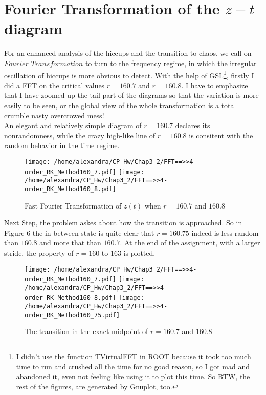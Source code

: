 \documentclass{article}
\begin{document}
\section{Fourier Transformation of the $z-t$ diagram}
\quad For an enhanced analysis of the hiccups and the transition to chaos, we call on $Fourier$ $Transfor$$mation$ to turn to the frequency regime, in which the irregular oscillation of hiccups is more obvious to detect. With the help of GSL\footnote{I didn't use the function TVirtualFFT in ROOT because it took too much time to run and crushed all the time for no good reason, so I got mad and abandoned it, even not feeling like using it to plot this time. So BTW, the rest of the figures, are generated by Gnuplot, too.}, firstly I did a FFT on the critical values $r=160.7$ and $r=160.8$. I have to emphasize that I have zoomed up the tail part of the diagrams so that the variation is more easily to be seen, or the global view of the whole transformation is a total crumble nasty overcrowed mess! \\
\quad An elegant and relatively simple diagram of $r=160.7$ declares its nonrandomness, while the crazy high-like line of $r=160.8$ is consitent with the random behavior in the time regime.\\
\begin{figure}[htbp]
\centering
\texttt{[image: /home/alexandra/CP\_Hw/Chap3\_2/FFT==>>4-order\_RK\_Method160\_7.pdf]}
\texttt{[image: /home/alexandra/CP\_Hw/Chap3\_2/FFT==>>4-order\_RK\_Method160\_8.pdf]}
\caption{Fast Fourier Transformation of $z(t)$ when $r=160.7$ and $160.8$}
\end{figure}
\newpage

Next Step, the problem askes about how the transition is approached. So in Figure 6 the in-between state is quite clear that $r=160.75$ indeed is less random than $160.8$ and more that than $160.7$. At the end of the assignment, with a larger stride, the property of $r=160$ to $163$ is plotted. \\ 
\begin{figure}[h]
\centering
\texttt{[image: /home/alexandra/CP\_Hw/Chap3\_2/FFT==>>4-order\_RK\_Method160\_7.pdf]}
\texttt{[image: /home/alexandra/CP\_Hw/Chap3\_2/FFT==>>4-order\_RK\_Method160\_8.pdf]}
\texttt{[image: /home/alexandra/CP\_Hw/Chap3\_2/FFT==>>4-order\_RK\_Method160\_75.pdf]}
\caption{The transition in the exact midpoint of $r=160.7$ and $160.8$}
\end{figure}
\end{document}
